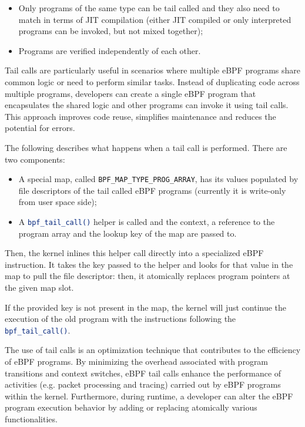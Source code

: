 \begin{itemize}
	\item 
		Only programs of the same type can be tail called and they also need to match in terms of JIT compilation (either JIT compiled or only interpreted programs can be invoked, but not mixed together);
	\item 
		Programs are verified independently of each other.
\end{itemize}

Tail calls are particularly useful in scenarios where multiple eBPF programs share common logic or need to perform similar tasks. 
Instead of duplicating code across multiple programs, developers can create a single eBPF program that encapsulates the shared logic and other programs can invoke it using tail calls. 
This approach improves code reuse, simplifies maintenance and reduces the potential for errors.

The following describes what happens when a tail call is performed. 
There are two components:

\begin{itemize}
	\item 
		A special map, called \colorbox{backcolour}{\lstinline[style=commandline, language=bash, breaklines=true]|BPF_MAP_TYPE_PROG_ARRAY|}, has its values populated by file descriptors of the tail called eBPF programs (currently it is write-only from user space side);
	\item 
		A \colorbox{backcolour}{\lstinline[style=commandline, language=bash, breaklines=true]|bpf_tail_call()|} helper is called and the context, a reference to the program array and the lookup key of the map are passed to. 
\end{itemize}

Then, the kernel inlines this helper call directly into a specialized eBPF instruction.
It takes the key passed to the helper and looks for that value in the map to pull the file descriptor: then, it atomically replaces program pointers at the given map slot. 

If the provided key is not present in the map, the kernel will just continue the execution of the old program with the instructions following the \colorbox{backcolour}{\lstinline[style=commandline, language=bash, breaklines=true]|bpf_tail_call()|}.

The use of tail calls is an optimization technique that contributes to the efficiency of eBPF programs. 
By minimizing the overhead associated with program transitions and context switches, eBPF tail calls enhance the performance of activities (e.g. packet processing and tracing) carried out by eBPF programs within the kernel.
Furthermore, during runtime, a developer can alter the eBPF program execution behavior by adding or replacing atomically various functionalities.

